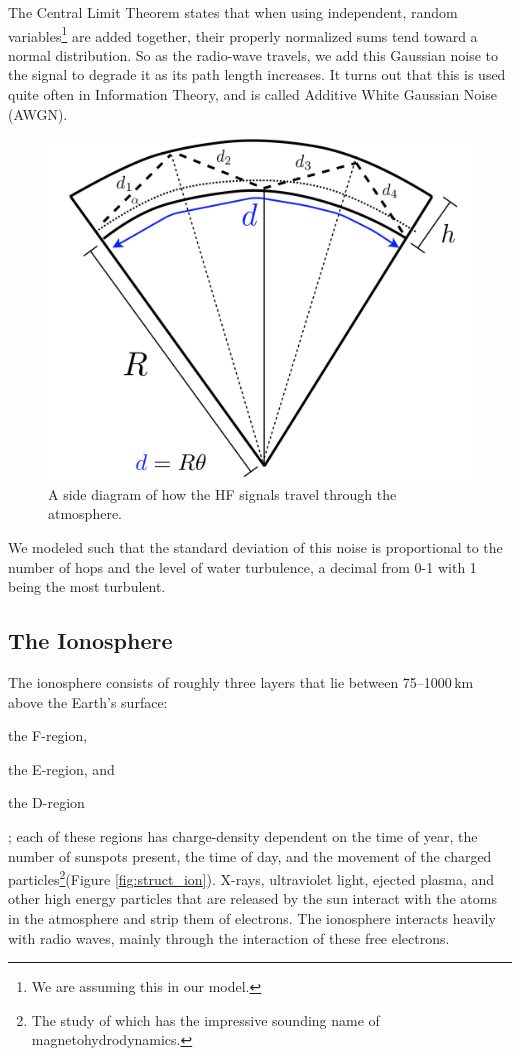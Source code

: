 \documentclass[11pt]{article}
\numberwithin{equation}{section}
\begin{document}
The Central Limit Theorem states that when using independent, random variables\footnote{We are assuming this in our model.} are added together, their properly normalized sums tend toward a normal distribution.\cite{central} So as the radio-wave travels, we add this Gaussian noise to the signal to degrade it as its path length increases. It turns out that this is used quite often in Information Theory, and is called Additive White Gaussian Noise (AWGN).\cite{shannon1984communication,kailath1968innovations}

\begin{figure}[ht]
 \begin{center}
     \includegraphics[width = 3.in]{figs/radio_curve.png}
 \end{center}
 \caption{A side diagram of how the HF signals travel through the atmosphere.}
 \label{fig:radio_curve}
\end{figure}

We modeled such that the standard deviation of this noise is proportional to the number of hops and the level of water turbulence, a decimal from 0-1 with 1 being the most turbulent.

\subsection{The Ionosphere} %
\label{sub:the_ionosphere}

The ionosphere consists of roughly three layers that lie between 75--1000\,km above the Earth's surface:
\begin{enumerate*}[(1)]
    \item the F-region,
    \item the E-region, and
    \item the D-region
\end{enumerate*}; each of these regions has charge-density dependent on the time of year, the number of sunspots present, the time of day, and the movement of the charged particles\footnote{The study of which has the impressive sounding name of magnetohydrodynamics.}(Figure \ref{fig:struct_ion}). X-rays, ultraviolet light, ejected plasma, and other high energy particles that are released by the sun interact with the atoms in the atmosphere and strip them of electrons.\cite{noauthor_tracking_nodate} The ionosphere interacts heavily with radio waves, mainly through the interaction of these free electrons.\cite{budden1961radio}
\end{document}
